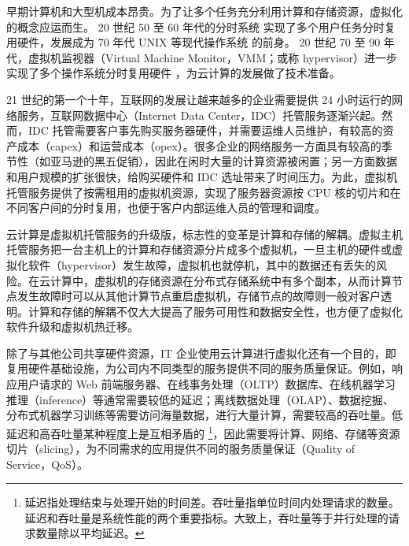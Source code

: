 早期计算机和大型机成本昂贵。为了让多个任务充分利用计算和存储资源，虚拟化的概念应运而生。
20 世纪 50 至 60 年代的分时系统 \cite{strachey1959time,amdahl1964architecture} 实现了多个用户任务分时复用硬件，发展成为 70 年代 UNIX 等现代操作系统 \cite{bach1986design} 的前身。
20 世纪 70 至 90 年代，虚拟机监视器（Virtual Machine Monitor，VMM；或称 hypervisor）进一步实现了多个操作系统分时复用硬件 \cite{popek1974formal,agesen2010evolution}，为云计算的发展做了技术准备。



21 世纪的第一个十年，互联网的发展让越来越多的企业需要提供 24 小时运行的网络服务，互联网数据中心（Internet Data Center，IDC）托管服务逐渐兴起。然而，IDC 托管需要客户事先购买服务器硬件，并需要运维人员维护，有较高的资产成本（capex）和运营成本（opex）。很多企业的网络服务一方面具有较高的季节性（如亚马逊的黑五促销），因此在闲时大量的计算资源被闲置；另一方面数据和用户规模的扩张很快，给购买硬件和 IDC 选址带来了时间压力。为此，虚拟机托管服务提供了按需租用的虚拟机资源，实现了服务器资源按 CPU 核的切片和在不同客户间的分时复用，也便于客户内部运维人员的管理和调度。

云计算是虚拟机托管服务的升级版，标志性的变革是计算和存储的解耦。虚拟主机托管服务把一台主机上的计算和存储资源分片成多个虚拟机，一旦主机的硬件或虚拟化软件（hypervisor）发生故障，虚拟机也就停机，其中的数据还有丢失的风险。在云计算中，虚拟机的存储资源在分布式存储系统中有多个副本，从而计算节点发生故障时可以从其他计算节点重启虚拟机，存储节点的故障则一般对客户透明。计算和存储的解耦不仅大大提高了服务可用性和数据安全性，也方便了虚拟化软件升级和虚拟机热迁移。

除了与其他公司共享硬件资源，IT 企业使用云计算进行虚拟化还有一个目的，即复用硬件基础设施，为公司内不同类型的服务提供不同的服务质量保证。例如，响应用户请求的 Web 前端服务器、在线事务处理（OLTP）数据库、在线机器学习推理（inference）等通常需要较低的延迟；离线数据处理（OLAP）、数据挖掘、分布式机器学习训练等需要访问海量数据，进行大量计算，需要较高的吞吐量。低延迟和高吞吐量某种程度上是互相矛盾的 \footnote{延迟指处理结束与处理开始的时间差。吞吐量指单位时间内处理请求的数量。延迟和吞吐量是系统性能的两个重要指标。大致上，吞吐量等于并行处理的请求数量除以平均延迟。}，因此需要将计算、网络、存储等资源切片（slicing），为不同需求的应用提供不同的服务质量保证（Quality of Service，QoS）。

